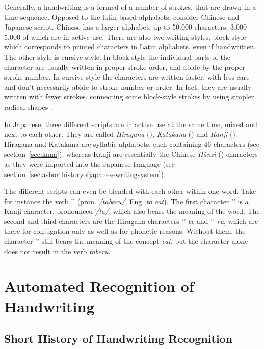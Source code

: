 Generally, a handwriting is a formed of a number of strokes, that are drawn
in a time sequence. Opposed to the latin-based alphabets, consider Chinese and
Japanese script. Chinese has a larger alphabet, up to 50.000 characters, 
3.000-5.000 of which are in active use. There are also two writing styles,
block style - which corresponds to printed characters in Latin alphabets,
even if handwritten. The other style is cursive style. In block style the
individual parts of the character are usually written in proper stroke order,
and abide by the proper stroke number. In cursive style the characters are
written faster, with less care and don't necessarily abide to stroke
number or order. In fact, they are usually written with fewer strokes,
connecting some block-style strokes by using simpler radical 
shapes .

In Japanese, three different scripts are in active use at the same time,
mixed and next to each other. They are called \emph{Hiragana} (), 
\emph{Katakana} () and \emph{Kanji} ().
Hiragana and Katakana are syllabic alphabets, each containing 46 characters
(see section~\ref{sec:kana}), whereas Kanji are essentially the Chinese 
\emph{Hànzì} () characters as they were imported into the Japanese 
language (see section~\ref{sec:ashorthistoryofjapanesewritingsystem}).

The different scripts can even be blended with each other within one word. 
Take for instance the verb '' (pron. \emph{/taberu/}, 
Eng. \emph{to eat}). 
The first character '' is a Kanji character, pronounced \emph{/ta/}, 
which also bears the meaning of the word. The second and third characters 
are the Hiragana characters '' \emph{be} and '' \emph{ru}, 
which are there for conjugation only as well as for phonetic reasons. 
Without them, the character '' still bears the meaning of the concept 
\emph{eat}, but the character alone does not result in the verb \emph{taberu}.

\section{Automated Recognition of Handwriting}
\label{sec:autorecoofhandwriting}

\subsection{Short History of Handwriting Recognition}
\label{sec:shorthistoryofhwr}

